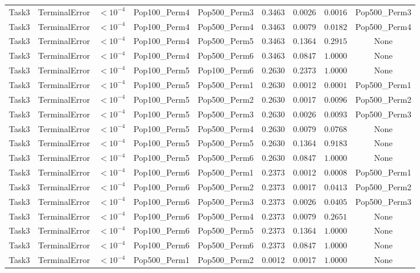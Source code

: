 \documentclass[8pt]{article}
\begin{document}
\begin{longtable}{llccccccc}
Task3 & TerminalError & $< 10^{-4}$ & Pop100\_Perm4 & Pop500\_Perm3 & 0.3463 & 0.0026 & $0.0016$ & Pop500\_Perm3 \\
Task3 & TerminalError & $< 10^{-4}$ & Pop100\_Perm4 & Pop500\_Perm4 & 0.3463 & 0.0079 & $0.0182$ & Pop500\_Perm4 \\
Task3 & TerminalError & $< 10^{-4}$ & Pop100\_Perm4 & Pop500\_Perm5 & 0.3463 & 0.1364 & $0.2915$ & None \\
Task3 & TerminalError & $< 10^{-4}$ & Pop100\_Perm4 & Pop500\_Perm6 & 0.3463 & 0.0847 & $1.0000$ & None \\
Task3 & TerminalError & $< 10^{-4}$ & Pop100\_Perm5 & Pop100\_Perm6 & 0.2630 & 0.2373 & $1.0000$ & None \\
Task3 & TerminalError & $< 10^{-4}$ & Pop100\_Perm5 & Pop500\_Perm1 & 0.2630 & 0.0012 & $0.0001$ & Pop500\_Perm1 \\
Task3 & TerminalError & $< 10^{-4}$ & Pop100\_Perm5 & Pop500\_Perm2 & 0.2630 & 0.0017 & $0.0096$ & Pop500\_Perm2 \\
Task3 & TerminalError & $< 10^{-4}$ & Pop100\_Perm5 & Pop500\_Perm3 & 0.2630 & 0.0026 & $0.0093$ & Pop500\_Perm3 \\
Task3 & TerminalError & $< 10^{-4}$ & Pop100\_Perm5 & Pop500\_Perm4 & 0.2630 & 0.0079 & $0.0768$ & None \\
Task3 & TerminalError & $< 10^{-4}$ & Pop100\_Perm5 & Pop500\_Perm5 & 0.2630 & 0.1364 & $0.9183$ & None \\
Task3 & TerminalError & $< 10^{-4}$ & Pop100\_Perm5 & Pop500\_Perm6 & 0.2630 & 0.0847 & $1.0000$ & None \\
Task3 & TerminalError & $< 10^{-4}$ & Pop100\_Perm6 & Pop500\_Perm1 & 0.2373 & 0.0012 & $0.0008$ & Pop500\_Perm1 \\
Task3 & TerminalError & $< 10^{-4}$ & Pop100\_Perm6 & Pop500\_Perm2 & 0.2373 & 0.0017 & $0.0413$ & Pop500\_Perm2 \\
Task3 & TerminalError & $< 10^{-4}$ & Pop100\_Perm6 & Pop500\_Perm3 & 0.2373 & 0.0026 & $0.0405$ & Pop500\_Perm3 \\
Task3 & TerminalError & $< 10^{-4}$ & Pop100\_Perm6 & Pop500\_Perm4 & 0.2373 & 0.0079 & $0.2651$ & None \\
Task3 & TerminalError & $< 10^{-4}$ & Pop100\_Perm6 & Pop500\_Perm5 & 0.2373 & 0.1364 & $1.0000$ & None \\
Task3 & TerminalError & $< 10^{-4}$ & Pop100\_Perm6 & Pop500\_Perm6 & 0.2373 & 0.0847 & $1.0000$ & None \\
Task3 & TerminalError & $< 10^{-4}$ & Pop500\_Perm1 & Pop500\_Perm2 & 0.0012 & 0.0017 & $1.0000$ & None \\

\end{longtable}
\end{document}
